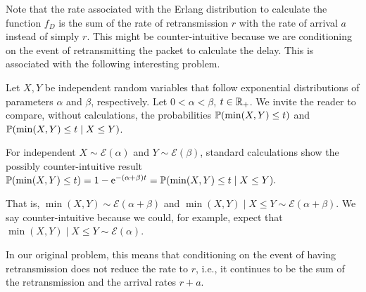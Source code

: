 \begin{note}
    Note that the rate associated with the Erlang distribution to calculate the function $f_D$ is the sum of the rate of retransmission $r$ with the rate of arrival $a$ instead of simply $r$.
    This might be counter-intuitive because we are conditioning on the event of retransmitting the packet to calculate the delay.
    This is associated with the following interesting problem.
    
    Let $X, Y$ be independent random variables that follow exponential distributions of parameters $\alpha$ and $\beta$, respectively.
    Let $0 < \alpha < \beta$, $t\in\R_+$. We invite the reader to compare, without calculations, the probabilities $\P(\min(X,Y)\le t)$ and $\P(\min(X,Y)\le t \mid X \le Y)$.

    For independent $X\sim\mathscr{E}(\alpha)$ and $Y\sim\mathscr{E}(\beta)$, standard calculations show the possibly counter-intuitive result
    $\P(\min(X,Y)\le t) = 1 - \euler^{-(\alpha+\beta)t} = \P(\min(X,Y)\le t \mid X \le Y).$
    
    That is, $\min(X,Y) \sim \mathscr{E}(\alpha+\beta)$ and $\min(X,Y) \mid X \le Y \sim \mathscr{E}(\alpha+\beta)$.
    We say counter-intuitive because we could, for example, expect that $\min(X,Y) \mid X \le Y \sim \mathscr{E}(\alpha)$.

    
    
    In our original problem, this means that conditioning on the event of having retransmission does not reduce the rate to $r$, i.e., it continues to be the sum of the retransmission and the arrival rates $r+a$.
\end{note}

